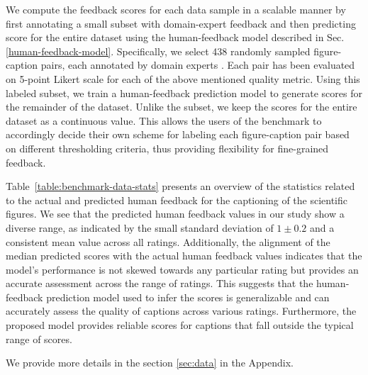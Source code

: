 \documentclass[11pt]{article}
\renewcommand{\cite}[1]{\citep{#1}}
\begin{document}
We compute the feedback scores for each data sample in a scalable manner by first annotating a small subset with domain-expert feedback and then predicting score for the entire dataset using the human-feedback model described in Sec. \ref{human-feedback-model}. Specifically, we select 438 randomly sampled figure-caption pairs, each annotated by domain experts \cite{summaries-as-captions-preprint}. Each pair has been evaluated on 5-point Likert scale for each of the above mentioned quality metric. Using this labeled subset, we train a human-feedback prediction model to generate scores for the remainder of the dataset. Unlike the subset, we keep the scores for the entire dataset as a continuous value. This allows the users of the benchmark to accordingly decide their own scheme for labeling each figure-caption pair based on different thresholding criteria, thus providing flexibility for fine-grained feedback. 

Table~\ref{table:benchmark-data-stats} presents an overview of the statistics related to the actual and predicted human feedback for the captioning of the scientific figures. We see that the predicted human feedback values in our study show a diverse range, as indicated by the small standard deviation of $1\pm0.2$ and a consistent mean value across all ratings. Additionally, the alignment of the median predicted scores with the actual human feedback values indicates that the model's performance is not skewed towards any particular rating but provides an accurate assessment across the range of ratings. This suggests that the human-feedback prediction model used to infer the scores is generalizable and can accurately assess the quality of captions across various ratings. Furthermore, the proposed model provides reliable scores for captions that fall outside the typical range of scores. 

We provide more details in the section \ref{sec:data} in the Appendix.


\end{document}
